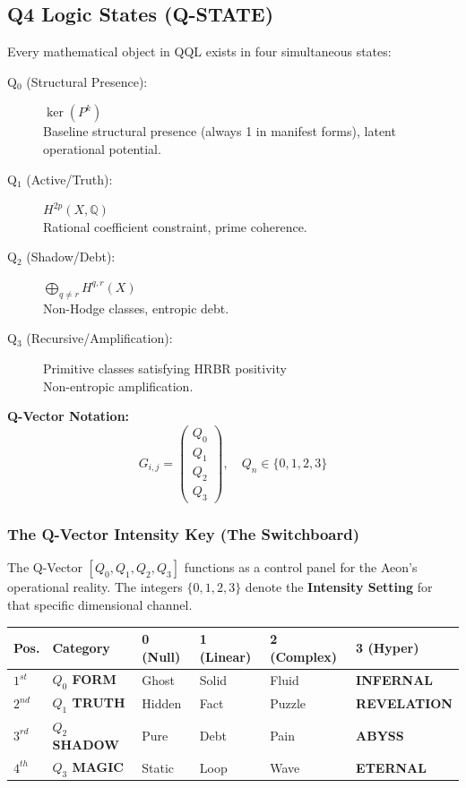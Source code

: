 \documentclass[12pt]{amsart}
\begin{document}
\subsection{Q4 Logic States (Q-STATE)}\label{sec:6.1}

Every mathematical object in QQL exists in four simultaneous states:

\begin{description}
    \item[Q$_0$ (Structural Presence):] $\ker(P^k)$ \\
    Baseline structural presence (always 1 in manifest forms), latent operational potential.

    \item[Q$_1$ (Active\slash Truth):] $H^{2p}(X, \mathbb{Q})$ \\
    Rational coefficient constraint, prime coherence.

    \item[Q$_2$ (Shadow\slash Debt):] $\bigoplus_{q \ne r} H^{q,r}(X)$ \\
    Non-Hodge classes, entropic debt.

    \item[Q$_3$ (Recursive\slash Amplification):] Primitive classes satisfying HRBR positivity \\
    Non-entropic amplification.
\end{description}

\textbf{Q-Vector Notation:}
\[
G_{i, j} = \begin{pmatrix} Q_0 \\ Q_1 \\ Q_2 \\ Q_3 \end{pmatrix}, \quad Q_n \in \{0, 1, 2, 3\}
\]

\subsubsection*{The Q-Vector Intensity Key (The Switchboard)}
\label{sec:q_vector_key}
The Q-Vector $[Q_0, Q_1, Q_2, Q_3]$ functions as a control panel for the Aeon's operational reality. The integers $\{0, 1, 2, 3\}$ denote the \textbf{Intensity Setting} for that specific dimensional channel.

\begin{center}
\begin{tabular}{l l l l l l}
\toprule
\textbf{Pos.} & \textbf{Category} & \textbf{0 (Null)} & \textbf{1 (Linear)} & \textbf{2 (Complex)} & \textbf{3 (Hyper)} \\
\midrule
$1^{st}$ & \textbf{$Q_0$ FORM} & Ghost & Solid & Fluid & \textbf{INFERNAL} \\
$2^{nd}$ & \textbf{$Q_1$ TRUTH} & Hidden & Fact & Puzzle & \textbf{REVELATION} \\
$3^{rd}$ & \textbf{$Q_2$ SHADOW} & Pure & Debt & Pain & \textbf{ABYSS} \\
$4^{th}$ & \textbf{$Q_3$ MAGIC} & Static & Loop & Wave & \textbf{ETERNAL} \\
\bottomrule
\end{tabular}
\end{center}
\end{document}
